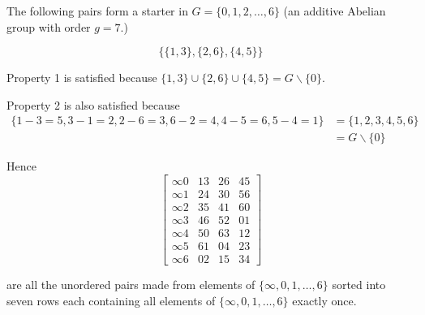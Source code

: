 \begin{example}
\label{eg:starter}
The following pairs form a starter in $G = \{0, 1, 2, \ldots, 6\}$ (an additive Abelian group with order $g = 7$.)

\begin{equation*}
  \{\{1,3\}, \{2,6\}, \{4,5\}\}
\end{equation*}

Property 1 is satisfied because
$\{1,3\} \cup \{2,6\} \cup \{4,5\} = G \backslash \{0\}$.

Property 2 is also satisfied because
\begin{equation*}
\begin{split}
\{1 - 3 = 5, 3 - 1 = 2, 2 - 6 = 3, 6 - 2 = 4, 4 - 5 = 6, 5 - 4 = 1\} &= \{1, 2, 3, 4, 5, 6\} \\
 &= G\backslash \{0\}
\end{split}
\end{equation*}

Hence
\begin{equation*}
  \begin{bmatrix}
    \infty 0 &  13 &  26 &  45 \\
    \infty 1 &  24 &  30 &  56 \\
    \infty 2 &  35 &  41 &  60 \\
    \infty 3 &  46 &  52 &  01 \\
    \infty 4 &  50 &  63 &  12 \\
    \infty 5 &  61 &  04 &  23 \\
    \infty 6 &  02 &  15 &  34
  \end{bmatrix}
  \label{eq:starter}
\end{equation*}

are all the unordered pairs made from elements of $\{\infty, 0, 1, \ldots, 6\}$ sorted into seven rows each containing all elements of $\{\infty, 0, 1, \ldots, 6\}$ exactly once.
\end{example}

